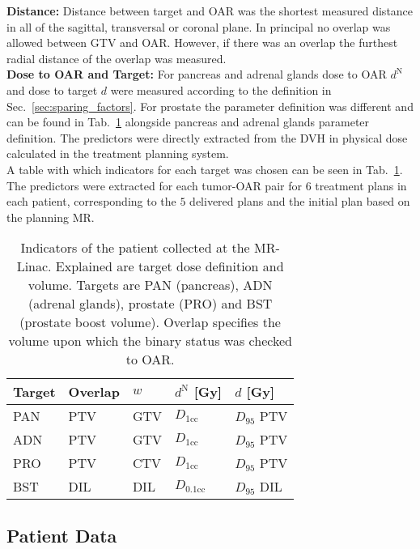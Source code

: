\documentclass[\relativeRoot/ada.tex]{subfiles}
\begin{document}
\textbf{Distance:} Distance between target and OAR was the shortest measured distance in all of the sagittal, transversal or coronal plane. In principal no overlap was allowed between GTV and OAR. However, if there was an overlap the furthest radial distance of the overlap was measured.\\

\textbf{Dose to OAR and Target:} For pancreas and adrenal glands dose to OAR $d^{\text{N}}$ and dose to target $d$ were measured according to the definition in Sec.~\ref{sec:sparing_factors}. For prostate the parameter definition was different and can be found in Tab.~\ref{tab:indicators_data} alongside pancreas and adrenal glands parameter definition. The predictors were directly extracted from the DVH in physical dose calculated in the treatment planning system.\\

A table with which indicators for each target was chosen can be seen in Tab.~\ref{tab:indicators_data}. The predictors were extracted for each tumor-OAR pair for $6$ treatment plans in each patient, corresponding to the $5$ delivered plans and the initial plan based on the planning MR.

\begin{table}[!htb]
    \centering
    \caption{Indicators of the patient collected at the MR-Linac. Explained are target dose definition and volume. Targets are PAN (pancreas), ADN (adrenal glands), prostate (PRO) and BST (prostate boost volume). Overlap specifies the volume upon which the binary status was checked to OAR.}
    \begin{tabular}{l|llll}
    \toprule
        Target & Overlap & $w$ & $d^{\text{N}}$ [Gy] & $d$ [Gy] \\
    \midrule
       PAN & PTV & GTV & $D_{1\text{cc}}$   & $D_{95}$ PTV \\
       ADN & PTV & GTV & $D_{1\text{cc}}$   & $D_{95}$ PTV \\
       PRO & PTV & CTV & $D_{1\text{cc}}$   & $D_{95}$ PTV \\
       BST & DIL & DIL & $D_{0.1\text{cc}}$ & $D_{95}$ DIL \\
     
    \bottomrule
    \end{tabular}
    \label{tab:indicators_data}
\end{table}

\subsection{Patient Data}
\end{document}
